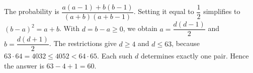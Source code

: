 The probability is $\dfrac{a(a-1)+b(b-1)}{(a+b)(a+b-1)}$. Setting it equal to $\dfrac{1}{2}$ simplifies to $(b-a)^2=a+b$. With $d=b-a\ge0$, we obtain $a=\dfrac{d(d-1)}{2}$ and $b=\dfrac{d(d+1)}{2}$. The restrictions give $d\ge4$ and $d\le63$, because $63\cdot64=4032\le4052<64\cdot65$. Each such $d$ determines exactly one pair. Hence the answer is $63-4+1=\boxed{60}$.
